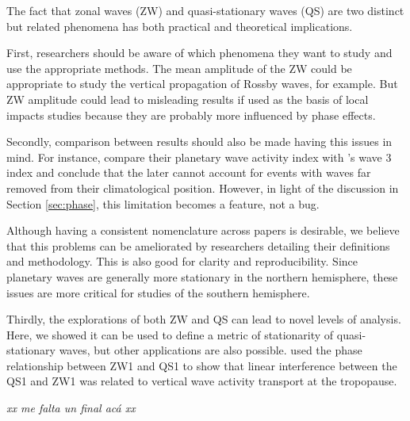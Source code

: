 \documentclass[draft,linenumbers]{agujournal2018}
\begin{document}
The fact that zonal waves (ZW) and quasi-stationary waves (QS) are two
distinct but related phenomena has both practical and theoretical
implications.

First, researchers should be aware of which phenomena they want to study
and use the appropriate methods. The mean amplitude of the ZW could be
appropriate to study the vertical propagation of Rossby waves, for
example. But ZW amplitude could lead to misleading results if used as
the basis of local impacts studies because they are probably more
influenced by phase effects.

Secondly, comparison between results should also be made having this
issues in mind. For instance, \citet{Irving2015} compare their planetary
wave activity index with \citet{Raphael2004}'s wave 3 index and conclude
that the later cannot account for events with waves far removed from
their climatological position. However, in light of the discussion in
Section \ref{sec:phase}, this limitation becomes a feature, not a bug.

Although having a consistent nomenclature across papers is desirable, we
believe that this problems can be ameliorated by researchers detailing
their definitions and methodology. This is also good for clarity and
reproducibility. Since planetary waves are generally more stationary in
the northern hemisphere, these issues are more critical for studies of
the southern hemisphere.

Thirdly, the explorations of both ZW and QS can lead to novel levels of
analysis. Here, we showed it can be used to define a metric of
stationarity of quasi-stationary waves, but other applications are also
possible. \citet{Smith2012} used the phase relationship between ZW1 and
QS1 to show that linear interference between the QS1 and ZW1 was related
to vertical wave activity transport at the tropopause.

\emph{xx me falta un final acá xx}


\end{document}
